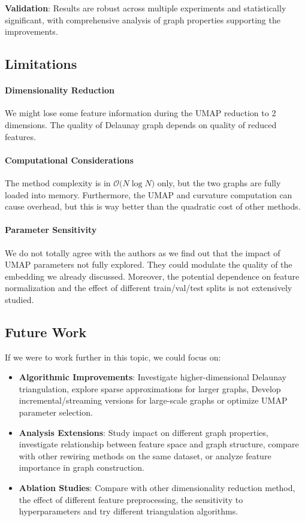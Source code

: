 \documentclass{article}
\theoremstyle{plain}
\theoremstyle{definition}
\theoremstyle{remark}
\begin{document}
\textbf{Validation}: Results are robust across multiple experiments and 
statistically significant, with comprehensive analysis of graph properties
supporting the improvements.

\subsection{Limitations}
\paragraph{Dimensionality Reduction} We might lose some feature information
during the UMAP reduction to 2 dimensions. The quality of Delaunay graph depends
 on quality of reduced features.

 \paragraph{Computational Considerations}
 The method complexity is in $\mathcal{O} \big( N \log N \big)$ only, but the 
 two graphs are  fully loaded into memory. Furthermore, the UMAP and curvature 
 computation can cause overhead, but this is way better than the quadratic cost
 of other methods.
   
\paragraph{Parameter Sensitivity} We do not totally agree with the authors as
we find out that the impact of UMAP parameters not fully explored. They could
modulate the quality of the embedding we already discussed. Moreover, the
potential dependence on feature normalization and the effect of different
 train/val/test splits is not extensively studied.

\subsection{Future Work}
If we were to work further in this topic, we could focus on:
\begin{itemize}
    \item \textbf{Algorithmic Improvements}: Investigate higher-dimensional 
    Delaunay triangulation, explore sparse approximations for larger graphs, 
   Develop incremental/streaming versions for large-scale graphs or 
   optimize UMAP parameter selection.

    \item \textbf{Analysis Extensions}:
   Study impact on different graph properties, 
   investigate relationship between feature space and graph structure,
   compare with other rewiring methods on the same dataset,
   or analyze feature importance in graph construction.

    \item \textbf{Ablation Studies}:
   Compare with other dimensionality reduction method, the effect of different 
   feature preprocessing, the sensitivity to hyperparameters and try different
    triangulation algorithms.
\end{itemize}
\end{document}
